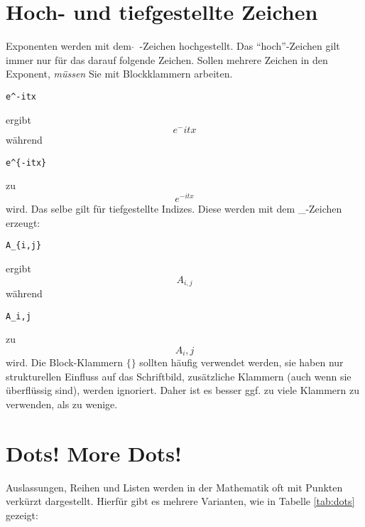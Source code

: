 \section{Hoch- und tiefgestellte Zeichen}

Exponenten werden mit dem $\hat{ }$\ -Zeichen hochgestellt. Das "`hoch"'-Zeichen gilt immer nur für das darauf folgende Zeichen. Sollen mehrere Zeichen in den Exponent, \emph{müssen} Sie mit Blockklammern arbeiten.
\begin{verbatim}
e^-itx
\end{verbatim}
ergibt
\begin{equation}
e^-itx
\end{equation}
während
\begin{verbatim}
e^{-itx}
\end{verbatim}
zu 
\begin{equation}
e^{-itx}
\end{equation}
wird. Das selbe gilt für tiefgestellte Indizes. Diese werden mit dem \_-Zeichen erzeugt:
\begin{verbatim}
A_{i,j}
\end{verbatim}
ergibt
\begin{equation}
A_{i,j}
\end{equation}
während 
\begin{verbatim}
A_i,j
\end{verbatim}
zu
\begin{equation}
A_i,j
\end{equation}
wird. Die Block-Klammern $\lbrace \rbrace$ sollten häufig verwendet werden, sie haben nur strukturellen Einfluss auf das Schriftbild, zusätzliche Klammern (auch wenn sie überflüssig sind), werden ignoriert. Daher ist es besser ggf. zu viele Klammern zu verwenden, als zu wenige.

\section{Dots! More Dots!}

Auslassungen, Reihen und Listen werden in der Mathematik oft mit Punkten verkürzt dargestellt. Hierfür gibt es mehrere Varianten, wie in Tabelle \ref{tab:dots} gezeigt:

